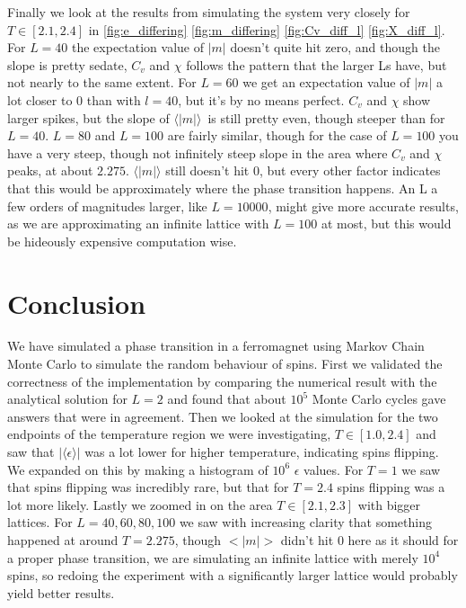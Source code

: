 \documentclass[english,notitlepage,reprint,nofootinbib]{revtex4-1}  %
\begin{document}
Finally we look at the results from simulating the system very closely for $T \in[2.1,2.4]$ in \ref{fig:e_differing} \ref{fig:m_differing} \ref{fig:Cv_diff_l} \ref{fig:X_diff_l}. For $L=40$ the expectation value of $|m|$ doesn't quite hit zero, and though the slope is pretty sedate, $C_v$ and $\chi$ follows the pattern that the larger Ls have, but not nearly to the same extent. For $L=60$ we get an expectation value of $|m|$ a lot closer to $0$ than with $l=40$, but it's by no means perfect. $C_v$ and $\chi$ show larger spikes, but the slope of $\langle|m|\rangle$ is still pretty even, though steeper than for $L=40$. $L=80$ and $L=100$ are fairly similar, though for the case of $L=100$ you have a very steep, though not infinitely steep slope in the area where $C_v$ and $\chi$ peaks, at about $2.275$. $\langle|m|\rangle$ still doesn't hit 0, but every other factor indicates that this would be approximately where the phase transition happens. An L a few orders of magnitudes larger, like $L=10000$, might give more accurate results, as we are approximating an infinite lattice with $L=100$ at most, but this would be hideously expensive computation wise.


 
\section{Conclusion}\label{sec:conclusion}
We have simulated a phase transition in a ferromagnet using Markov Chain Monte Carlo to simulate the random behaviour of spins. First we validated the correctness of the implementation by comparing the numerical result with the analytical solution for $L=2$ and found that about $10^5$ Monte Carlo cycles gave answers that were in agreement. Then we looked at the simulation for the two endpoints of the temperature region we were investigating, $T\in [1.0, 2.4]$ and saw that $|\langle\epsilon\rangle|$ was a lot lower for higher temperature, indicating spins flipping. We expanded on this by making a histogram of $10^6$ $\epsilon$ values. For $T=1$ we saw that spins flipping was incredibly rare, but that for $T=2.4$ spins flipping was a lot more likely. Lastly we zoomed in on the area $T \in[2.1,2.3]$ with bigger lattices. For $L=40,60,80,100$ we saw with increasing clarity that something happened at around $T=2.275$, though $<|m|>$ didn't hit $0$ here as it should for a proper phase transition, we are simulating an infinite lattice with merely $10^4$ spins, so redoing the experiment with a significantly larger lattice would probably yield better results.
\onecolumngrid
\end{document}
